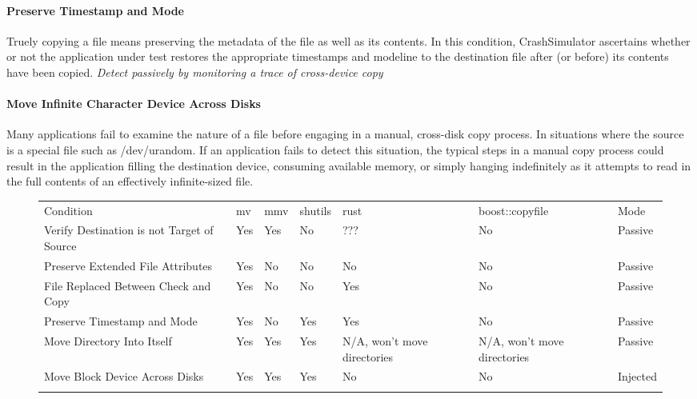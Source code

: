         \paragraph{Preserve Timestamp and Mode}

        Truely copying a file means preserving the metadata of the file as well as its contents.  In this condition,
        CrashSimulator ascertains whether or not the application under test restores the appropriate timestamps and
        modeline to the destination file after (or before) its contents have been copied. \emph{Detect passively by
          monitoring a trace of cross-device copy}

        \paragraph{Move Infinite Character Device Across Disks}

        Many applications fail to examine the nature of a file before engaging in a manual, cross-disk copy process.  In
        situations where the source is a special file such as /dev/urandom.  If an application fails to detect this
        situation, the typical steps in a manual copy process could result in the application filling the destination
        device, consuming available memory, or simply hanging indefinitely as it attempts to read in the full contents
        of an effectively infinite-sized file.

        \begin{figure*}[t]
                \scriptsize{}
                \begin{tabular}{l l l l l l | l}
                \toprule{}
                  Condition & mv & mmv & shutils & rust & boost::copyfile & Mode\\
                  Verify Destination is not Target of Source & Yes & Yes & No & ??? & No & Passive\\
                  Preserve Extended File Attributes & Yes & No & No & No & No & Passive\\
                  File Replaced Between Check and Copy & Yes & No & No & Yes & No & Passive\\
                  Preserve Timestamp and Mode & Yes & No & Yes & Yes & No & Passive\\
                  Move Directory Into Itself & Yes & Yes & Yes & N/A, won't move directories & N/A, won't move directories & Passive\\
                  Move Block Device Across Disks & Yes & Yes & Yes & No & No & Injected\\
                \bottomrule{}
                \end{tabular}
        \end{figure*}

